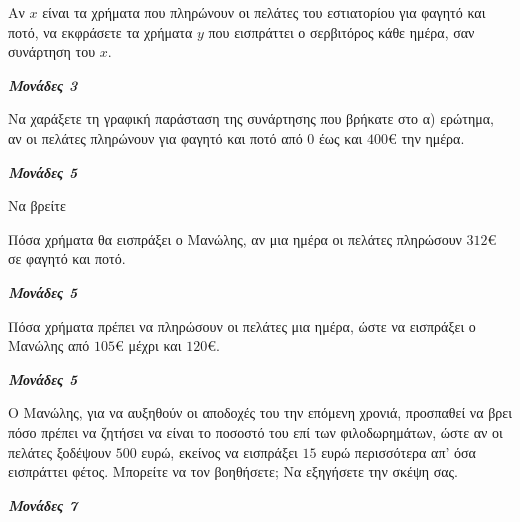 \documentclass[11pt,a4paper,twoside]{book}
\newcommand{\monades}[1]{
\hspace*{\fill}
\textbf{\textit{\textcolor{maincolor}{Μονάδες #1}}}}
\begin{document}
\begin{alist}
\item Αν $x$ είναι τα χρήματα που πληρώνουν οι πελάτες του εστιατορίου για φαγητό και ποτό, να εκφράσετε τα χρήματα $y$ που εισπράττει ο σερβιτόρος κάθε ημέρα, σαν συνάρτηση του $x$.
\monades{3}
\item Να χαράξετε τη γραφική παράσταση της συνάρτησης που βρήκατε στο α) ερώτημα, αν οι πελάτες πληρώνουν για φαγητό και ποτό από $0$ έως και $400\euro$ την ημέρα.
\monades{5}
\begin{center}

\end{center}

\item Να βρείτε

\begin{rlist}
\item Πόσα χρήματα θα εισπράξει ο Μανώλης, αν μια ημέρα οι πελάτες πληρώσουν $312\euro$ σε φαγητό και ποτό.
\monades{5}
\item Πόσα χρήματα πρέπει να πληρώσουν οι πελάτες μια ημέρα, ώστε να εισπράξει ο Μανώλης από $105\euro$ μέχρι και $120\euro$.
\monades{5}
\end{rlist}
\item Ο Μανώλης, για να αυξηθούν οι αποδοχές του την επόμενη χρονιά, προσπαθεί να βρει πόσο πρέπει να ζητήσει να είναι το ποσοστό του επί των φιλοδωρημάτων, ώστε αν οι πελάτες ξοδέψουν $500$ ευρώ, εκείνος να εισπράξει $15$ ευρώ περισσότερα απ' όσα εισπράττει φέτος. Μπορείτε να τον βοηθήσετε; Να εξηγήσετε την σκέψη σας.
\monades{7}
\end{alist}

\vspace{4mm}
\end{document}
